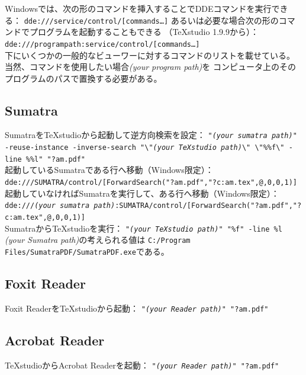 Windowsでは、次の形のコマンドを挿入することでDDEコマンドを実行できる：
\texttt{dde:///service/control/{[}commands\ldots{}{]}}
あるいは必要な場合次の形のコマンドでプログラムを起動することもできる
（TeXstudio 1.9.9から）：
\texttt{dde:///programpath:service/control/{[}commands\ldots{}{]}}\\


下にいくつかの一般的なビューワーに対するコマンドのリストを載せている。
当然、コマンドを使用したい場合\emph{(your program path)}を
コンピュータ上のそのプログラムのパスで置換する必要がある。

\subsection{Sumatra}

SumatraをTeXstudioから起動して逆方向検索を設定：
\texttt{"\emph{(your sumatra path)}" -reuse-instance -inverse-search
 "\textbackslash{}"\emph{(your TeXstudio path)}\textbackslash{}"
  \textbackslash{}"\%\%f\textbackslash{}" -line \%\%l" "?am.pdf"}\\


起動しているSumatraである行へ移動（Windows限定）：\\
\texttt{dde:///SUMATRA/control/{[}ForwardSearch("?am.pdf","?c:am.tex",@,0,0,1){]}}\\


起動していなければSumatraを実行して、ある行へ移動（Windows限定）：
\texttt{dde:///\emph{(your sumatra path)}:SUMATRA/control/{[}ForwardSearch("?am.pdf","?c:am.tex",@,0,0,1){]}}\\


SumatraからTeXstudioを実行： \texttt{"\emph{(your TeXstudio path)}" "\%f" -line \%l}\\


\emph{(your Sumatra path)}の考えられる値は
\verb+C:/Program Files/SumatraPDF/SumatraPDF.exe+である。

\subsection{Foxit Reader}

Foxit ReaderをTeXstudioから起動：
 \texttt{"\emph{(your Reader path)"} "?am.pdf"}

\subsection{Acrobat Reader}

TeXstudioからAcrobat Readerを起動：
 \texttt{"\emph{(your Reader path)"} "?am.pdf"}\\


